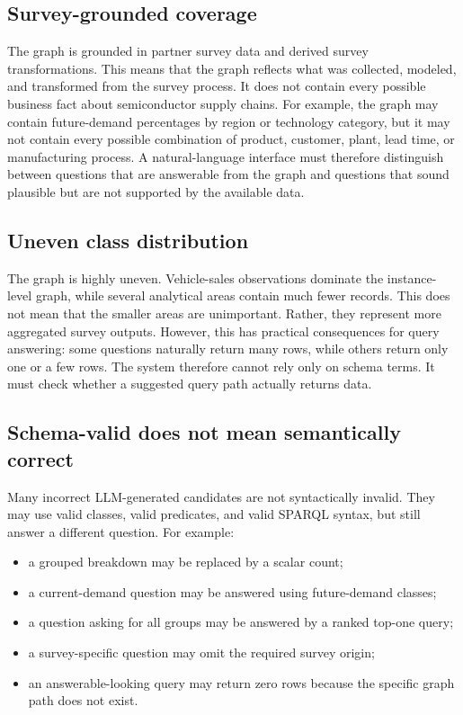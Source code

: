 \documentclass[
  12pt,
  english,
  oneside]{report}
\begin{document}
\subsection{Survey-grounded coverage}

The graph is grounded in partner survey data and derived survey transformations. This means that the graph reflects what was collected, modeled, and transformed from the survey process. It does not contain every possible business fact about semiconductor supply chains. For example, the graph may contain future-demand percentages by region or technology category, but it may not contain every possible combination of product, customer, plant, lead time, or manufacturing process. A natural-language interface must therefore distinguish between questions that are answerable from the graph and questions that sound plausible but are not supported by the available data.

\subsection{Uneven class distribution}

The graph is highly uneven. Vehicle-sales observations dominate the instance-level graph, while several analytical areas contain much fewer records. This does not mean that the smaller areas are unimportant. Rather, they represent more aggregated survey outputs. However, this has practical consequences for query answering: some questions naturally return many rows, while others return only one or a few rows. The system therefore cannot rely only on schema terms. It must check whether a suggested query path actually returns data.

\subsection{Schema-valid does not mean semantically correct}

Many incorrect LLM-generated candidates are not syntactically invalid. They may use valid classes, valid predicates, and valid SPARQL syntax, but still answer a different question. For example:

\begin{itemize}
    \item a grouped breakdown may be replaced by a scalar count;
    \item a current-demand question may be answered using future-demand classes;
    \item a question asking for all groups may be answered by a ranked top-one query;
    \item a survey-specific question may omit the required survey origin;
    \item an answerable-looking query may return zero rows because the specific graph path does not exist.
\end{itemize}
\end{document}

